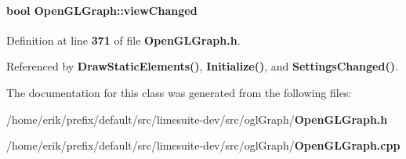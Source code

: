 \paragraph[{view\+Changed}]{\setlength{\rightskip}{0pt plus 5cm}bool Open\+G\+L\+Graph\+::view\+Changed\hspace{0.3cm}{\ttfamily [private]}}\label{classOpenGLGraph_a16b1711107a59e39000e7817bbb829d3}


Definition at line {\bf 371} of file {\bf Open\+G\+L\+Graph.\+h}.



Referenced by {\bf Draw\+Static\+Elements()}, {\bf Initialize()}, and {\bf Settings\+Changed()}.



The documentation for this class was generated from the following files\+:\begin{DoxyCompactItemize}
\item 
/home/erik/prefix/default/src/limesuite-\/dev/src/ogl\+Graph/{\bf Open\+G\+L\+Graph.\+h}\item 
/home/erik/prefix/default/src/limesuite-\/dev/src/ogl\+Graph/{\bf Open\+G\+L\+Graph.\+cpp}\end{DoxyCompactItemize}
